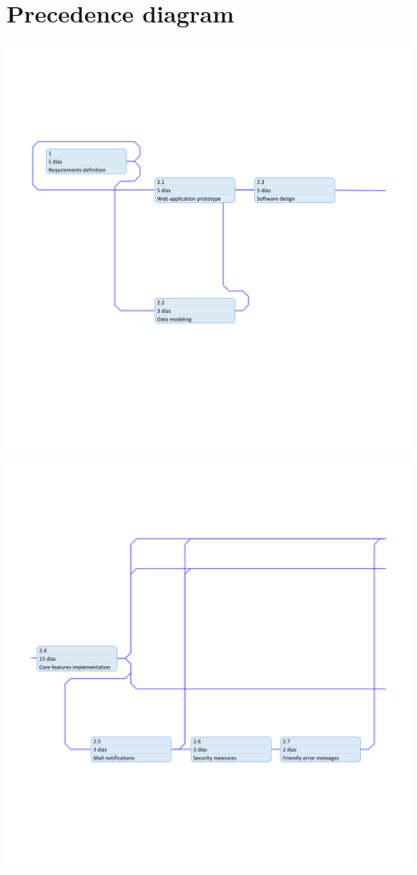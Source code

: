 \documentclass{DeustoFDP}
\begin{document}
\section{Precedence diagram}
\begin{center}
	\includegraphics[width=1\linewidth]{fig/precedence-1}
\end{center}
\begin{center}
	\includegraphics[width=1\linewidth]{fig/precedence-2}
\end{center}
\end{document}
